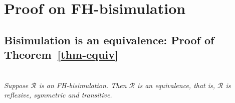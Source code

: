 \documentclass{elsarticle}
\begin{document}
\newpage
\appendix    
\section{Proof on FH-bisimulation}
\subsection{Bisimulation is an equivalence: Proof of Theorem~\ref{thm-equiv}}\label{thm-equiv-proof}~\\
        \emph{Suppose $\mathcal{R}$ 
       	is an FH-bisimulation. Then $\mathcal{R}$ is an equivalence, that is, 
       	$\mathcal{R}$ is 
       	reflexive, symmetric and transitive.
       	}
       
%
%
%
%
\end{document}
